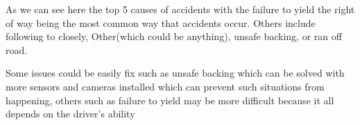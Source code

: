 \documentclass[
  letterpaper,
  DIV=11,
  numbers=noendperiod]{scrartcl}
\begin{document}
As we can see here the top 5 causes of accidents with the failure to
yield the right of way being the most common way that accidents occur.
Others include following to closely, Other(which could be anything),
unsafe backing, or ran off road.

Some issues could be easily fix such as unsafe backing which can be
solved with more sensors and cameras installed which can prevent such
situations from happening, others such as failure to yield may be more
difficult because it all depends on the driver's ability
\end{document}
